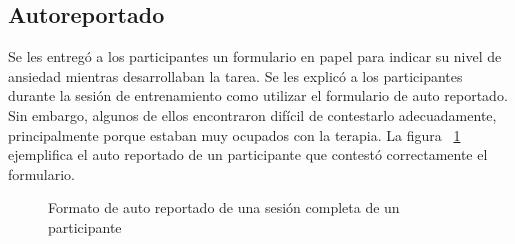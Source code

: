 	\subsection{Autoreportado}
	Se les entreg\'o a los participantes un formulario en papel para indicar su nivel de ansiedad mientras desarrollaban la tarea. Se les explic\'o a los participantes durante la sesi\'on de entrenamiento como utilizar el formulario de auto reportado. Sin embargo, algunos de ellos encontraron dif\'icil de contestarlo adecuadamente, principalmente porque estaban muy ocupados con la terapia. La figura ~\ref{fig:imggtlabel} ejemplifica el auto reportado de un participante que contest\'o correctamente el formulario.
	\begin{figure}[h!]
		\centering
		\caption{Formato de auto reportado de una sesi\'on completa de un participante}\label{fig:imggtlabel}
	\end{figure}

